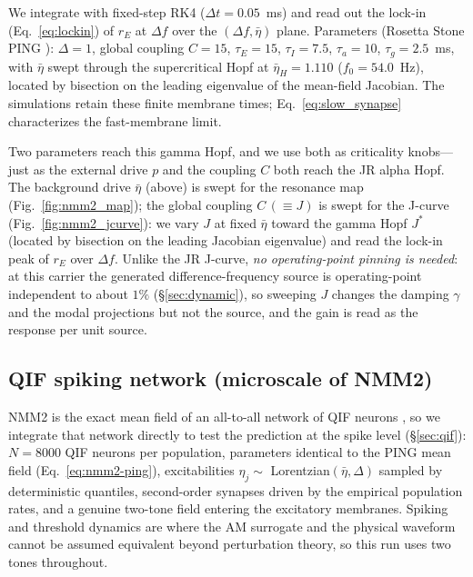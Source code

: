 \documentclass[11pt,a4paper]{article}
\providecommand{\DIFaddbegin}{} %
\providecommand{\DIFaddend}{} %
\begin{document}
\DIFaddend We integrate with fixed-step RK4 ($\Delta t=0.05$~ms) and read out the lock-in
(Eq.~\eqref{eq:lockin}) of $r_E$ at $\Delta f$ over the $(\Delta f, \bar\eta)$ plane.
Parameters (Rosetta Stone PING \cite{ruffini2025rosetta}): $\Delta=1$, global coupling
$C=15$, $\tau_E=15$, $\tau_I=7.5$, $\tau_a=10$, $\tau_g=2.5$~ms, with $\bar\eta$ swept
through the supercritical Hopf at $\bar\eta_H=1.110$ ($f_0=54.0$~Hz), located by bisection
on the leading eigenvalue of the mean-field Jacobian. The simulations retain these
finite membrane times; Eq.~\eqref{eq:slow_synapse} characterizes the fast-membrane limit.

Two parameters reach this gamma Hopf, and we use both as criticality knobs---just as the
external drive $p$ and the coupling $C$ both reach the JR alpha Hopf. The background drive
$\bar\eta$ (above) is swept for the resonance map (Fig.~\ref{fig:nmm2_map}); the global
coupling $C\,(\equiv J)$ is swept for the J-curve (Fig.~\ref{fig:nmm2_jcurve}): we vary
$J$ at fixed $\bar\eta$ toward the gamma Hopf $J^*$ (located by bisection on the leading
Jacobian eigenvalue) and read the lock-in peak of $r_E$ over $\Delta f$. Unlike the JR
J-curve, \emph{no operating-point pinning is needed}: at this carrier the generated
difference-frequency source is operating-point independent to about $1\%$
(\S\ref{sec:dynamic}), so sweeping $J$ changes the damping $\gamma$ and the modal
projections but not the source, and the gain is read as the response per unit source.

\subsection{QIF spiking network (microscale of NMM2)}\label{sec:qif-methods}
NMM2 is the exact mean field of an all-to-all network of QIF neurons
\cite{montbrio2015,ruffini2025rosetta,clusella2023}, so we integrate that network directly
to test the prediction at the spike level (\S\ref{sec:qif}): $N=8000$ QIF neurons per
population, parameters identical to the PING mean field (Eq.~\eqref{eq:nmm2-ping}),
excitabilities $\eta_j\sim$ Lorentzian$(\bar\eta,\Delta)$ sampled by deterministic
quantiles, second-order synapses driven by the empirical population rates, and a genuine
two-tone field entering the excitatory membranes. Spiking and threshold dynamics are
where the AM surrogate and the physical waveform cannot be assumed equivalent beyond
perturbation theory, so this run uses two tones throughout.
\DIFaddbegin 
\end{document}
